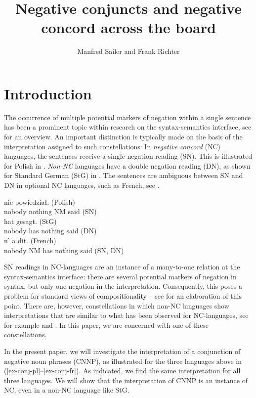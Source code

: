 \documentclass[output=paper]{langsci/langscibook}
\title{Negative conjuncts and negative concord across the board}
\author{Manfred Sailer\affiliation{Goethe-Universität Frankfurt a.M.} and Frank Richter\affiliation{Goethe-Universität Frankfurt a.M.}}
\begin{document}
\maketitle

\section{Introduction}
\label{Sec-Intro}

The occurrence of multiple potential markers of negation within a single sentence has been a prominent topic within research on the syntax-semantics interface, see \citet{Giannakidou:05} for an overview. 
An important distinction is typically made on the basis of the
interpretation assigned to such constellations: Ιn \emph{negative
  concord} (NC) languages, the sentences receive a single-negation
reading (SN). 
This is illustrated for Polish in . 
\emph{Non-NC} languages have a double negation reading (DN), as shown for Standard German (StG) in .
The sentences are ambiguous between SN and DN in optional NC languages, such as French, see .

\ea \label{ex-pl}
\gll {}  nie powiedział. (Polish)\\
nobody nothing NM said (SN)\\
\glt {}
\ex \label{ex-de}
\gll {} hat  gesagt. (StG)\\
nobody has nothing said (DN)\\
\glt {}
\ex \label{ex-fr}
\gll {} n' a  dit. (French)\\
nobody NM has nothing said {(SN, DN)}\\
\z

SN readings in NC-languages are an instance of a many-to-one relation at the syntax-semantics interface: there are several potential markers of negation in syntax, but only one negation in the interpretation. Consequently, this poses a problem for standard views of compositionality -- see \citet{Sailer:16} for an elaboration of this point.
There are, however, constellations in which non-NC languages show interpretations that are similar to what has been observed for NC-languages, see for example \citet{Puskas:12} and \citet{Larrivee:16}.
In this paper, we are concerned with one of these constellations.

In the present paper, we will investigate the interpretation of a conjunction of negative noun phrases (CNNP), as illustrated for the three languages above in (\ref{ex-conj-pl}--\ref{ex-conj-fr}). 
As indicated, we find the same interpretation for all three languages. 
We will show that the interpretation of CNNP is an instance of NC, even in a non-NC language like StG. 
\end{document}
